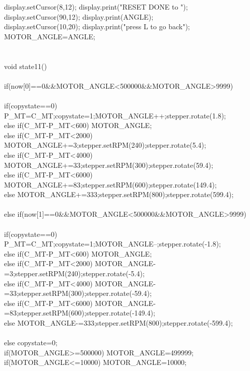 \begin{verbbox}
{{	{  display.setCursor(8,12); display.print("RESET DONE to ");\\
		display.setCursor(90,12); display.print(ANGLE);\\
		display.setCursor(10,20); display.print("press L to go back");\\
		MOTOR\_ANGLE=ANGLE;}\\
}\\
\\
void state11()\\
{\\
	if(now[0]==0\&\&MOTOR\_ANGLE<500000\&\&MOTOR\_ANGLE>9999)\\
	{\\
		if(copystate==0) {P\_MT=C\_MT;copystate=1;MOTOR\_ANGLE++;stepper.rotate(1.8);}\\
		else if(C\_MT-P\_MT<600) MOTOR\_ANGLE;\\
		else if(C\_MT-P\_MT<2000) {MOTOR\_ANGLE+=3;stepper.setRPM(240);stepper.rotate(5.4);}\\
		else if(C\_MT-P\_MT<4000) {MOTOR\_ANGLE+=33;stepper.setRPM(300);stepper.rotate(59.4);}\\
		else if(C\_MT-P\_MT<6000) {MOTOR\_ANGLE+=83;stepper.setRPM(600);stepper.rotate(149.4);}\\
		else {MOTOR\_ANGLE+=333;stepper.setRPM(800);stepper.rotate(599.4);}\\
	}\\
	else if(now[1]==0\&\&MOTOR\_ANGLE<500000\&\&MOTOR\_ANGLE>9999)\\
	{\\
		if(copystate==0) {P\_MT=C\_MT;copystate=1;MOTOR\_ANGLE--;stepper.rotate(-1.8);}\\
		else if(C\_MT-P\_MT<600) MOTOR\_ANGLE;\\
		else if(C\_MT-P\_MT<2000) {MOTOR\_ANGLE-=3;stepper.setRPM(240);stepper.rotate(-5.4);}\\
		else if(C\_MT-P\_MT<4000) {MOTOR\_ANGLE-=33;stepper.setRPM(300);stepper.rotate(-59.4);}\\
		else if(C\_MT-P\_MT<6000) {MOTOR\_ANGLE-=83;stepper.setRPM(600);stepper.rotate(-149.4);}\\
		else {MOTOR\_ANGLE-=333;stepper.setRPM(800);stepper.rotate(-599.4);}\\
	}\\
	else copystate=0;\\
	if(MOTOR\_ANGLE>=500000) MOTOR\_ANGLE=499999;\\
	if(MOTOR\_ANGLE<=10000) MOTOR\_ANGLE=10000;\\
}}
\end{verbbox}
